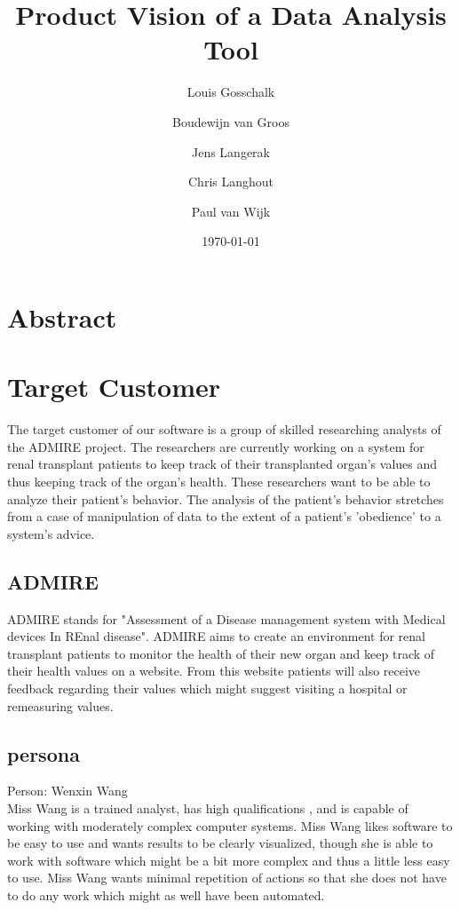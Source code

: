 \documentclass[a4paper]{article}
\title{Product Vision of a Data Analysis Tool}
\author[1]{Louis Gosschalk}
\author[2]{Boudewijn van Groos}
\author[3]{Jens Langerak}
\author[4]{Chris Langhout}
\author[5]{Paul van Wijk}
\affil[1]{lgosschalk \\
4214528}
\affil[2]{bvangroos \\
4229843}
\affil[3]{jlangerak \\
4317327}
\affil[4]{clanghout \\
4281705}
\affil[5]{pvanwijk \\
4285034}
\affil[ ]{Health Informatics Group C}
\date{\today}
\begin{document}
\maketitle

\section*{Abstract}

\newpage

\tableofcontents

\newpage

\section{Target Customer}
The target customer of our software is a group of skilled researching analysts of the ADMIRE project. The researchers are currently working on a system for renal transplant patients to keep track of their transplanted organ's values and thus keeping track of the organ's health. These researchers want to be able to analyze their patient's behavior. The analysis of the patient's behavior stretches from a case of manipulation of data to the extent of a patient's 'obedience' to a system's advice. 

\subsection{ADMIRE}
ADMIRE stands for "Assessment of a Disease management system with Medical devices In REnal disease". ADMIRE aims to create an environment for renal transplant patients to monitor the health of their new organ and keep track of their health values on a website. From this website patients will also receive feedback regarding their values which might suggest visiting a hospital or remeasuring values. \cite{Admire}

\subsection{persona}
Person: Wenxin Wang \\
Miss Wang is a trained analyst, has high qualifications \cite{persona}, and is capable of working with moderately complex computer systems. Miss Wang likes software to be easy to use and wants results to be clearly visualized, though she is able to work with software which might be a bit more complex and thus a little less easy to use. Miss Wang wants minimal repetition of actions so that she does not have to do any work which might as well have been automated.
\end{document}
